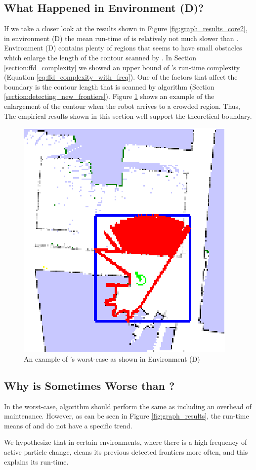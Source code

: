 \subsection{What Happened in Environment (D)?}
If we take a closer look at the results shown in Figure \ref{fig:graph_results_core2},
in environment (D) the mean run-time of \WFD is relatively not much slower than
\FFD. Environment (D) contains plenty of regions that seems to have small
obstacles which enlarge the length of the contour scanned by \FFD. In Section
\ref{section:ffd_complexity} we showed an upper bound of \FFD's run-time
complexity (Equation \eqref{eq:ffd_complexity_with_freq}). One of the factors
that affect the boundary is the contour length that is scanned by \FFD algorithm
(Section \ref{section:detecting_new_frontiers}). Figure
\ref{fig:ffd_worst_case_contour} shows an example of the enlargement of the
contour when the robot arrives to a crowded region. Thus, The empirical results
shown in this section well-support the theoretical boundary.

\begin{figure} 
 \centering
 \includegraphics[width=0.4\columnwidth,keepaspectratio,angle=0]
 {images/environment_D_bad_contour_example2.eps}
 \caption{An example of \FFD's worst-case as shown in Environment (D)}
 \label{fig:ffd_worst_case_contour}
\end{figure}

\subsection{Why is \WFDINC Sometimes Worse than \WFD?}
In the worst-case, \WFDINC algorithm should perform the
same as \WFD including an overhead of maintenance. However, 
as can be seen in Figure \ref{fig:graph_results}, the run-time means of
\WFD and \WFDINC do not have a specific trend.

We hypothesize that in certain environments, where there is a high frequency
of active particle change, \WFDINC cleans its previous detected frontiers
more often, and this explains its run-time.

